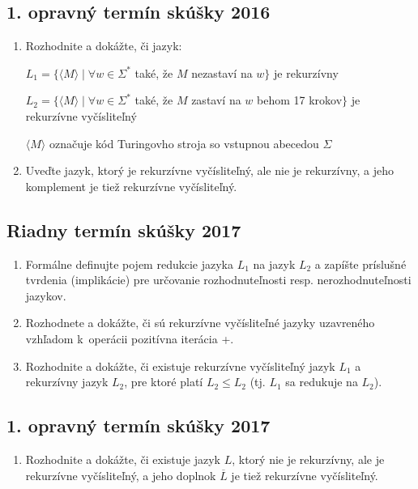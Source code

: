 \documentclass[11pt,a4paper]{article}
\begin{document}
		\subsection{1. opravný termín skúšky 2016}
		
		\begin{enumerate}
			\item Rozhodnite a dokážte, či jazyk:
			
			$L_1 = \{\langle M \rangle \mid \forall w \in \Sigma^*$ také, že $M$ nezastaví na $w\}$ je rekurzívny
			
			$L_2 = \{\langle M \rangle \mid \forall w \in \Sigma^*$ také, že $M$ zastaví na $w$ behom 17 krokov$\}$ je rekurzívne vyčísliteľný
			
			$\langle M \rangle$ označuje kód Turingovho stroja so vstupnou abecedou $\Sigma$
			
			\item Uveďte jazyk, ktorý je rekurzívne vyčísliteľný, ale nie je rekurzívny, a jeho komplement je tiež rekurzívne vyčísliteľný.
		\end{enumerate}	

		\subsection{Riadny termín skúšky 2017}

		\begin{enumerate}
			\item Formálne definujte pojem redukcie jazyka $L_1$ na jazyk $L_2$ a zapíšte príslušné tvrdenia (implikácie) pre určovanie rozhodnuteľnosti resp. nerozhodnuteľnosti jazykov.

			\item Rozhodnete a dokážte, či sú rekurzívne vyčísliteľné jazyky uzavreného vzhľadom k~operácii pozitívna iterácia +.
	
			\item Rozhodnite a dokážte, či existuje rekurzívne vyčísliteľný jazyk $L_1$ a rekurzívny jazyk $L_2$, pre ktoré platí $L_2 \leq L_2$ (tj. $L_1$ sa redukuje na $L_2$).
		\end{enumerate}	
			
		\subsection{1. opravný termín skúšky 2017}

		\begin{enumerate}
			\item Rozhodnite a dokážte, či existuje jazyk $L$, ktorý nie je rekurzívny, ale je rekurzívne vyčísliteľný, a jeho doplnok $\overline{L}$ je tiež rekurzívne vyčísliteľný.
		\end{enumerate}	
\end{document}
